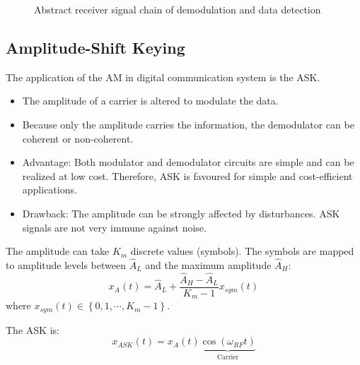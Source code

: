 \begin{refsection}
\begin{figure}[H]
	\centering
	\caption{Abstract receiver signal chain of demodulation and data detection}
\end{figure}

\subsection{Amplitude-Shift Keying}

The application of the \ac{AM} in digital communication system is the  \acf{ASK}.
\begin{itemize}
	\item The amplitude of a carrier is altered to modulate the data.
	\item Because only the amplitude carries the information, the demodulator can be coherent or non-coherent.
	\item Advantage: Both modulator and demodulator circuits are simple and can be realized at low cost. Therefore, \ac{ASK} is favoured for simple and cost-efficient applications.
	\item Drawback: The amplitude can be strongly affected by disturbances. \ac{ASK} signals are not very immune against noise.
\end{itemize}

The amplitude can take $K_m$ discrete values (symbols). The symbols are mapped to amplitude levels between $\hat{A}_L$ and the maximum amplitude $\hat{A}_H$:
\begin{equation}
	x_{A}(t) = \hat{A}_L + \frac{\hat{A}_H - \hat{A}_L}{K_m - 1} x_{sym}(t)
\end{equation}
where $x_{sym}(t) \in \left\{0, 1, \cdots, K_m - 1\right\}$.

The \ac{ASK} is:
\begin{equation}
	x_{ASK}(t) = x_{A}(t) \underbrace{\cos\left(\omega_{RF} t\right)}_{\text{Carrier}}
\end{equation}


\end{refsection}
